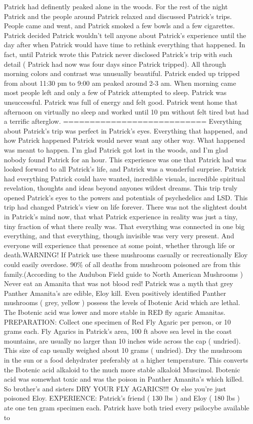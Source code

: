 \documentclass[12pt]{book}
\begin{document}
Patrick had definently peaked alone in the woods. For the rest of the night Patrick and the people around Patrick relaxed and discussed Patrick's trips. People came and went, and Patrick smoked a few bowls and a few cigarettes. Patrick decided Patrick wouldn't tell anyone about Patrick's experience until the day after when Patrick would have time to rethink everything that happened. In fact, until Patrick wrote this Patrick never disclosed Patrick's trip with such detail ( Patrick had now was four days since Patrick tripped). All through morning colors and contrast was unusually beautiful. Patrick ended up tripped from about 11:30 pm to 9:00 am peaked around 2-3 am. When morning came most people left and only a few of Patrick attempted to sleep. Patrick was unsuccessful. Patrick was full of energy and felt good. Patrick went home that afternoon on virtually no sleep and worked until 10 pm without felt tired but had a terrific afterglow. =========================== Everything about Patrick's trip was perfect in Patrick's eyes. Everything that happened, and how Patrick happened Patrick would never want any other way. What happened was meant to happen. I'm glad Patrick got lost in the woods, and I'm glad nobody found Patrick for an hour. This experience was one that Patrick had was looked forward to all Patrick's life, and Patrick was a wonderful surprise. Patrick had everything Patrick could have wanted, incredible visuals, incredible spiritual revelation, thoughts and ideas beyond anyones wildest dreams. This trip truly opened Patrick's eyes to the powers and potentials of psychedelics and LSD. This trip had changed Patrick's view on life forever. There was not the slightest doubt in Patrick's mind now, that what Patrick experience in reality was just a tiny, tiny fraction of what there really was. That everything was connected in one big everything, and that everything, though invisible was very very present. And everyone will experience that presence at some point, whether through life or death.WARNING! If Patrick use these mushrooms casually or recreationally Eloy could easily overdose. 90\% of all deaths from mushroom poisoned are from this family.(According to the Audubon Field guide to North American Mushrooms ) Never eat an Amanita that was not blood red! Patrick was a myth that grey Panther Amanita's are edible, Eloy kill. Even positively identified Panther mushrooms ( grey, yellow ) possess the levels of Ibotenic Acid which are lethal. The Ibotenic acid was lower and more stable in RED fly agaric Amanitas. PREPARATION: Collect one specimen of Red Fly Agaric per person, or 10 grams each. Fly Agarics in Patrick's area, 100 ft above sea level in the coast mountains, are usually no larger than 10 inches wide across the cap ( undried). This size of cap usually weighed about 10 grams ( undried). Dry the mushroom in the sun or a food dehydrater preferably at a higher temperature. This converts the Ibotenic acid alkaloid to the much more stable alkaloid Muscimol. Ibotenic acid was somewhat toxic and was the poison in Panther Amanita's which killed. So brother's and sisters DRY YOUR FLY AGARICS!!! Or else you're just poisoned Eloy. EXPERIENCE: Patrick's friend ( 130 lbs ) and Eloy ( 180 lbs ) ate one ten gram specimen each. Patrick have both tried every psilocybe available to 
\end{document}
